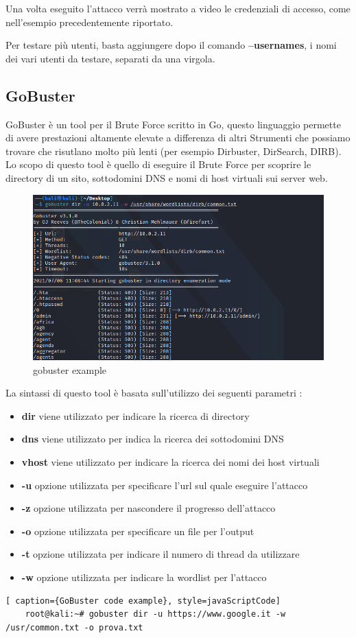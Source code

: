 Una volta eseguito l'attacco verrà mostrato a video le credenziali di accesso, come nell'esempio precedentemente riportato.

Per testare più utenti, basta aggiungere dopo il comando \textbf{--usernames}, i nomi dei vari utenti da testare, separati da una virgola.

\newpage


\subsection{GoBuster}

GoBuster\cite{gobuster} è un tool per il Brute Force scritto in Go, questo linguaggio permette di avere prestazioni altamente elevate a differenza di altri Strumenti che possiamo trovare che risutlano molto più lenti (per esempio Dirbuster, DirSearch, DIRB). Lo scopo di questo tool è quello di eseguire il Brute Force per scoprire le directory di un sito, sottodomini DNS e nomi di host virtuali sui server web.

\begin{figure}[htpb!]
    \centering
    \includegraphics[width=\linewidth]{Immagini/5/gobuster.png}
    \caption{gobuster example}
    \label{fig:gobuster example}
\end{figure}

La sintassi di questo tool è basata sull'utilizzo dei seguenti parametri :
\begin{itemize}
    \item \textbf{dir} viene utilizzato per indicare la ricerca di directory
    \item \textbf{dns} viene utilizzato per indica la ricerca dei sottodomini DNS
    \item \textbf{vhost} viene utilizzato per indicare la ricerca dei nomi dei host virtuali
    \item \textbf{-u} opzione  utilizzata per specificare l'url sul quale eseguire l'attacco
    \item \textbf{-z} opzione utilizzata per nascondere il progresso dell'attacco
    \item \textbf{-o} opzione utilizzata per specificare un file per l'output 
    \item \textbf{-t} opzione utilizzata per indicare il numero di thread da utilizzare 
    \item \textbf{-w} opzione utilizzata per indicare la wordlist per l'attacco
\end{itemize}

\begin{lstlisting}[ caption={GoBuster code example}, style=javaScriptCode]
    root@kali:~# gobuster dir -u https://www.google.it -w /usr/common.txt -o prova.txt
\end{lstlisting}

\label{chap:conc}

